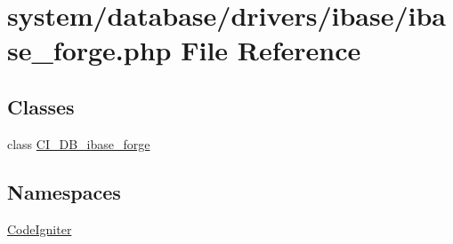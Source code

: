 \hypertarget{ibase__forge_8php}{}\section{system/database/drivers/ibase/ibase\+\_\+forge.php File Reference}
\label{ibase__forge_8php}
\subsection*{Classes}
\begin{DoxyCompactItemize}
\item 
class \mbox{\hyperlink{class_c_i___d_b__ibase__forge}{C\+I\+\_\+\+D\+B\+\_\+ibase\+\_\+forge}}
\end{DoxyCompactItemize}
\subsection*{Namespaces}
\begin{DoxyCompactItemize}
\item 
 \mbox{\hyperlink{namespace_code_igniter}{Code\+Igniter}}
\end{DoxyCompactItemize}
